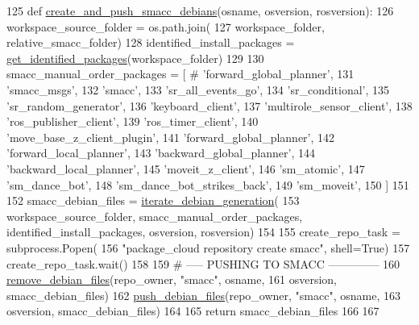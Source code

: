 \begin{DoxyCode}
125 \textcolor{keyword}{def }\hyperlink{namespacegenerate__debs_af7237c463c8e5b4df369e6befc154c50}{create\_and\_push\_smacc\_debians}(osname, osversion, rosversion):
126     workspace\_source\_folder = os.path.join(
127         workspace\_folder, relative\_smacc\_folder)
128     identified\_install\_packages = \hyperlink{namespacegenerate__debs_aa91b87c6d9c3ed04015845cc9298431a}{get\_identified\_packages}(workspace\_folder)
129 
130     smacc\_manual\_order\_packages = [  \textcolor{comment}{# 'forward\_global\_planner',}
131         \textcolor{stringliteral}{'smacc\_msgs'},
132         \textcolor{stringliteral}{'smacc'},
133         \textcolor{stringliteral}{'sr\_all\_events\_go'},
134         \textcolor{stringliteral}{'sr\_conditional'},
135         \textcolor{stringliteral}{'sr\_random\_generator'},
136         \textcolor{stringliteral}{'keyboard\_client'},
137         \textcolor{stringliteral}{'multirole\_sensor\_client'},
138         \textcolor{stringliteral}{'ros\_publisher\_client'},
139         \textcolor{stringliteral}{'ros\_timer\_client'},
140         \textcolor{stringliteral}{'move\_base\_z\_client\_plugin'},
141         \textcolor{stringliteral}{'forward\_global\_planner'},
142         \textcolor{stringliteral}{'forward\_local\_planner'},
143         \textcolor{stringliteral}{'backward\_global\_planner'},
144         \textcolor{stringliteral}{'backward\_local\_planner'},        
145         \textcolor{stringliteral}{'moveit\_z\_client'},
146         \textcolor{stringliteral}{'sm\_atomic'},
147         \textcolor{stringliteral}{'sm\_dance\_bot'},
148         \textcolor{stringliteral}{'sm\_dance\_bot\_strikes\_back'},
149         \textcolor{stringliteral}{'sm\_moveit'},
150     ]
151 
152     smacc\_debian\_files = \hyperlink{namespacegenerate__debs_a2615a6fc7860b6aa9e920e6b4d886589}{iterate\_debian\_generation}(
153         workspace\_source\_folder, smacc\_manual\_order\_packages, identified\_install\_packages, osversion, 
      rosversion)
154 
155     create\_repo\_task = subprocess.Popen(
156         \textcolor{stringliteral}{"package\_cloud repository create smacc"}, shell=\textcolor{keyword}{True})
157     create\_repo\_task.wait()
158 
159     \textcolor{comment}{# ----- PUSHING TO SMACC --------------}
160     \hyperlink{namespacegenerate__debs_a08095040d038b3613ad0e77fd4e7f60e}{remove\_debian\_files}(repo\_owner, \textcolor{stringliteral}{"smacc"},  osname,
161                         osversion, smacc\_debian\_files)
162     \hyperlink{namespacegenerate__debs_a9b22f5ad65b40b7903c467eda308e575}{push\_debian\_files}(repo\_owner, \textcolor{stringliteral}{"smacc"},  osname,
163                       osversion, smacc\_debian\_files)
164 
165     \textcolor{keywordflow}{return} smacc\_debian\_files
166 
167 
\end{DoxyCode}


